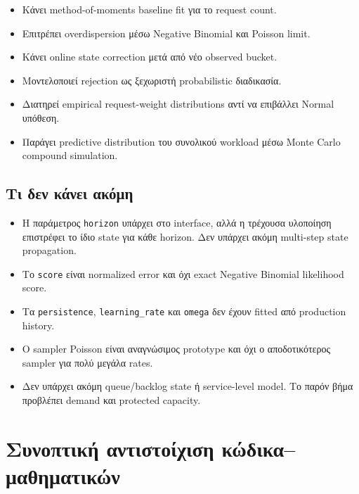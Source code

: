 \documentclass[11pt,a4paper]{article}
\newcommand{\code}[1]{\texttt{#1}}
\begin{document}
\begin{itemize}
  \item Κάνει method-of-moments baseline fit για το request count.
  \item Επιτρέπει overdispersion μέσω Negative Binomial και Poisson limit.
  \item Κάνει online state correction μετά από νέο observed bucket.
  \item Μοντελοποιεί rejection ως ξεχωριστή probabilistic διαδικασία.
  \item Διατηρεί empirical request-weight distributions αντί να επιβάλλει
        Normal υπόθεση.
  \item Παράγει predictive distribution του συνολικού workload μέσω
        Monte Carlo compound simulation.
\end{itemize}

\subsection{Τι δεν κάνει ακόμη}

\begin{itemize}
  \item Η παράμετρος \code{horizon} υπάρχει στο interface, αλλά η τρέχουσα
        υλοποίηση επιστρέφει το ίδιο state για κάθε horizon. Δεν υπάρχει
        ακόμη multi-step state propagation.
  \item Το \code{score} είναι normalized error και όχι exact Negative
        Binomial likelihood score.
  \item Τα \code{persistence}, \code{learning\_rate} και \code{omega} δεν
        έχουν fitted από production history.
  \item Ο sampler Poisson είναι αναγνώσιμος prototype και όχι ο
        αποδοτικότερος sampler για πολύ μεγάλα rates.
  \item Δεν υπάρχει ακόμη queue/backlog state ή service-level model. Το
        παρόν βήμα προβλέπει demand και protected capacity.
\end{itemize}

\section{Συνοπτική αντιστοίχιση κώδικα--μαθηματικών}
\end{document}
